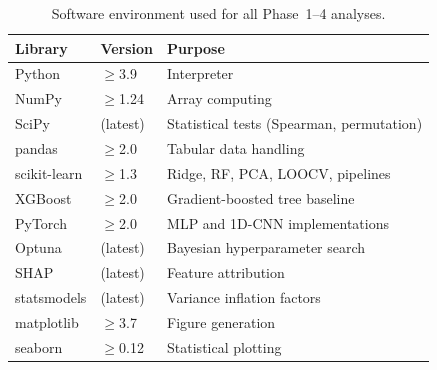\documentclass[12pt, a4paper]{article}
\newcommand{\todo}[1]{\textcolor{red}{\textbf{[TODO: #1]}}}
\begin{document}
\begin{appendices}
\begin{table}[h]
\centering
\caption{Software environment used for all Phase~1--4 analyses.}
\label{tab:software}
\begin{tabular}{lll}
\toprule
\textbf{Library} & \textbf{Version} & \textbf{Purpose} \\
\midrule
Python        & $\geq$3.9   & Interpreter \\
NumPy         & $\geq$1.24  & Array computing \\
SciPy         & (latest)    & Statistical tests (Spearman, permutation) \\
pandas        & $\geq$2.0   & Tabular data handling \\
scikit-learn  & $\geq$1.3   & Ridge, RF, PCA, LOOCV, pipelines \\
XGBoost       & $\geq$2.0   & Gradient-boosted tree baseline \\
PyTorch       & $\geq$2.0   & MLP and 1D-CNN implementations \\
Optuna        & (latest)    & Bayesian hyperparameter search \\
SHAP          & (latest)    & Feature attribution \\
statsmodels   & (latest)    & Variance inflation factors \\
matplotlib    & $\geq$3.7   & Figure generation \\
seaborn       & $\geq$0.12  & Statistical plotting \\
\bottomrule
\end{tabular}
\end{table}







\end{appendices}
\end{document}
